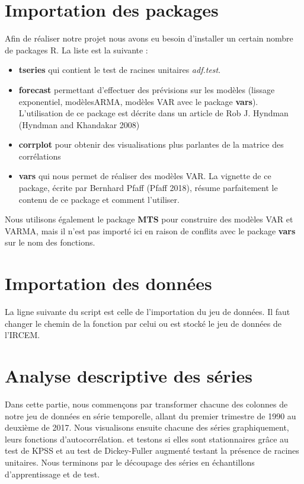 \documentclass[12pt,]{article}
\providecommand{\tightlist}{%
  \setlength{\itemsep}{0pt}\setlength{\parskip}{0pt}}
\begin{document}
\section{Importation des packages}\label{importation-des-packages}

Afin de réaliser notre projet nous avons eu besoin d'installer un
certain nombre de packages R. La liste est la suivante :

\begin{itemize}
\tightlist
\item
  \textbf{tseries} qui contient le test de racines unitaires
  \emph{adf.test}.
\item
  \textbf{forecast} permettant d'effectuer des prévisions sur les
  modèles (lissage exponentiel, modèlesARMA, modèles VAR avec le package
  \textbf{vars}). L'utilisation de ce package est décrite dans un
  article de Rob J. Hyndman (Hyndman and Khandakar 2008)
\item
  \textbf{corrplot} pour obtenir des visualisations plus parlantes de la
  matrice des corrélations
\item
  \textbf{vars} qui nous permet de réaliser des modèles VAR. La vignette
  de ce package, écrite par Bernhard Pfaff (Pfaff 2018), résume
  parfaitement le contenu de ce package et comment l'utiliser.
\end{itemize}

Nous utilisons également le package \textbf{MTS} pour construire des
modèles VAR et VARMA, mais il n'est pas importé ici en raison de
conflits avec le package \textbf{vars} sur le nom des fonctions.

\section{Importation des données}\label{importation-des-donnees}

La ligne suivante du script est celle de l'importation du jeu de
données. Il faut changer le chemin de la fonction par celui ou est
stocké le jeu de données de l'IRCEM.

\section{Analyse descriptive des
séries}\label{analyse-descriptive-des-series}

Dans cette partie, nous commençons par transformer chacune des colonnes
de notre jeu de données en série temporelle, allant du premier trimestre
de 1990 au deuxième de 2017. Nous visualisons ensuite chacune des séries
graphiquement, leurs fonctions d'autocorrélation. et testons si elles
sont stationnaires grâce au test de KPSS et au test de Dickey-Fuller
augmenté testant la présence de racines unitaires. Nous terminons par le
découpage des séries en échantillons d'apprentissage et de test.
\end{document}
